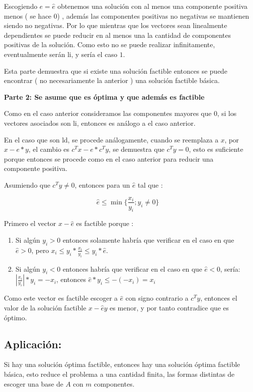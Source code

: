\documentclass[14pt]{extarticle}
\begin{document}
Escogiendo $e = \hat{e}$ obtenemos una solución con al menos una componente positiva menos ( se hace $0$) , además las componentes positivas no negativas se mantienen siendo no negativas. Por lo que mientras que los vectores sean linealmente dependientes se puede reducir en al menos una la cantidad de componentes positivas de la solución. Como esto no se puede realizar infinitamente, eventualmente serán li, y sería el caso $1$.

Esta parte demuestra que si existe una solución factible entonces se puede encontrar ( no necesariamente la anterior ) una solución factible básica.

\textbf{Parte 2: Se asume que es óptima y que además es factible}

Como en el caso anterior consideramos las componentes mayores que $0$, si los vectores asociados son li, entonces es análogo a el caso anterior.

En el caso que son ld, se procede análogamente, cuando se reemplaza a $x$, por $x - e*y$, el cambio es $c^Tx - e*c^Ty$, se demuestra que $c^Ty = 0$, esto es suficiente porque entonces se procede como en el caso anterior para reducir una componente positiva.

Asumiendo que $c^Ty \neq 0$, entonces para un $\hat{e}$ tal que :

$$\hat{e} \leq \min \{ \frac{x_i}{y_i} ; y_i \neq 0 \}$$

Primero el vector $x - \hat{e}$ es factible porque :

\begin{enumerate}
	\item Si algún $y_i > 0$ entonces solamente habría que verificar en el caso en que $\hat{e} > 0$, pero $x_i \leq y_i * \frac{x_i}{y_i} \leq y_i * \hat{e}$.
	\item Si algún $y_i < 0$ entonces habría que verificar en el caso en que $\hat{e} < 0$, sería: $| \frac{x_i}{y_i} | * y_i = -x_i$, entonces $\hat{e} * y_i \leq -(-x_i) = x_i$
\end{enumerate}

Como este vector es factible escoger a $\hat{e}$ con signo contrario a $c^Ty$, entonces el valor de la solución factible $x - \hat{e}y$ es menor, y por tanto contradice que es óptimo.

\subsection{Aplicación: }

Si hay una solución óptima factible, entonces hay una solución óptima factible básica, esto reduce el problema a una cantidad finita, las formas distintas de escoger una base de $A$ con $m$ componentes.
\end{document}
